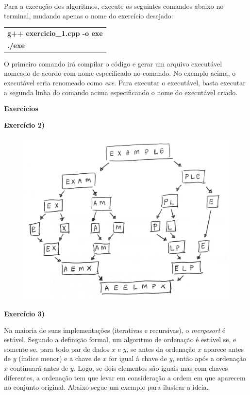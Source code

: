 \documentclass[12pt,a4paper]{article}
\begin{document}
Para a execução dos algoritmos, execute os seguintes comandos abaixo no terminal, mudando apenas o nome do exercício desejado:

\begin{table}[H]
	\centering
	\begin{tabular}{|l|}
		\hline
		\textbf{g++ exercicio\_1.cpp -o exe}\\		
		\textbf{./exe}\\
		\hline
	\end{tabular}
\end{table}

O primeiro comando irá compilar o código e gerar um arquivo executável nomeado de acordo com nome especificado no comando. No exemplo acima, o executável seria renomeado como \textit{exe}. Para executar o executável, basta executar a segunda linha do comando acima especificando o nome do executável criado.


\newpage

{\Large \textbf{Exercícios}}

\vspace{0.5cm}

\textbf{Exercício 2)} 

\begin{figure}[H]
    \centering
    \includegraphics[width=\textwidth]{images/exe2.pdf}
\end{figure}

\hrulefill

\textbf{Exercício 3)} 

Na maioria de suas implementações (iterativas e recursivas), o \emph{mergesort} é estável. Segundo a definição formal, um algoritmo de ordenação é estável se, e somente se, para todo par de dados $x$ e $y$, se antes da ordenação $x$ aparece antes de $y$ (índice menor) e a chave de $x$ for igual à chave de $y$, então após a ordenação $x$ continuará antes de $y$. Logo, se dois elementos são iguais mas com chaves diferentes, a ordenação tem que levar em consideração a ordem em que aparecem no conjunto original. Abaixo segue um exemplo para ilustrar a ideia.
\end{document}
